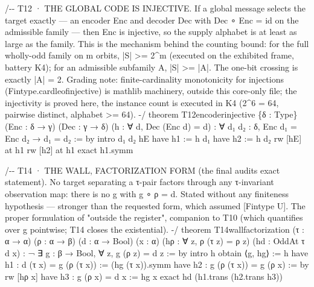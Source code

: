 \documentclass[10pt]{article}
\renewcommand{\_}{\origunderscore\allowbreak}
\newenvironment{Shaded}{}{}
\newcommand{\NormalTok}[1]{#1}
\begin{document}
\begin{Shaded}
\begin{Highlighting}[]
\NormalTok{/{-}{-} T12 · THE GLOBAL CODE IS INJECTIVE. If a global message selects the}
\NormalTok{    target exactly — an encoder Enc and decoder Dec with Dec ∘ Enc = id on}
\NormalTok{    the admissible family — then Enc is injective, so the supply alphabet}
\NormalTok{    is at least as large as the family. This is the mechanism behind the}
\NormalTok{    counting bound: for the full wholly{-}odd family on m orbits, |S| \textgreater{}= 2\^{}m}
\NormalTok{    (executed on the exhibited frame, battery K4); for an admissible}
\NormalTok{    subfamily A, |S| \textgreater{}= |A|. The one{-}bit crossing is exactly |A| = 2.}
\NormalTok{    Grading note: finite{-}cardinality monotonicity for injections}
\NormalTok{    (Fintype.card\_le\_of\_injective) is mathlib machinery, outside this}
\NormalTok{    core{-}only file; the injectivity is proved here, the instance count is}
\NormalTok{    executed in K4 (2\^{}6 = 64, pairwise distinct, alphabet \textgreater{}= 64). {-}/}
\NormalTok{theorem T12\_encoder\_injective \{δ : Type\} (Enc : δ → γ) (Dec : γ → δ)}
\NormalTok{    (h : ∀ d, Dec (Enc d) = d) :}
\NormalTok{    ∀ d₁ d₂ : δ, Enc d₁ = Enc d₂ → d₁ = d₂ := by}
\NormalTok{  intro d₁ d₂ hE}
\NormalTok{  have h1 := h d₁}
\NormalTok{  have h2 := h d₂}
\NormalTok{  rw [hE] at h1}
\NormalTok{  rw [h2] at h1}
\NormalTok{  exact h1.symm}

\NormalTok{/{-}{-} T14 · THE WALL, FACTORIZATION FORM (the final audit\textquotesingle{}s exact statement).}
\NormalTok{    No target separating a τ{-}pair factors through any τ{-}invariant}
\NormalTok{    observation map: there is no g with g ∘ ρ = d. Stated without any}
\NormalTok{    finiteness hypothesis — stronger than the requested form, which}
\NormalTok{    assumed [Fintype U]. The proper formulation of "outside the register",}
\NormalTok{    companion to T10 (which quantifies over g pointwise; T14 closes the}
\NormalTok{    existential). {-}/}
\NormalTok{theorem T14\_wall\_factorization (τ : α → α) (ρ : α → β) (d : α → Bool) (x : α)}
\NormalTok{    (hρ : ∀ z, ρ (τ z) = ρ z) (hd : OddAt τ d x) :}
\NormalTok{    ¬ ∃ g : β → Bool, ∀ z, g (ρ z) = d z := by}
\NormalTok{  intro h}
\NormalTok{  obtain ⟨g, hg⟩ := h}
\NormalTok{  have h1 : d (τ x) = g (ρ (τ x)) := (hg (τ x)).symm}
\NormalTok{  have h2 : g (ρ (τ x)) = g (ρ x) := by rw [hρ x]}
\NormalTok{  have h3 : g (ρ x) = d x := hg x}
\NormalTok{  exact hd (h1.trans (h2.trans h3))}


\end{Highlighting}
\end{Shaded}
\end{document}
